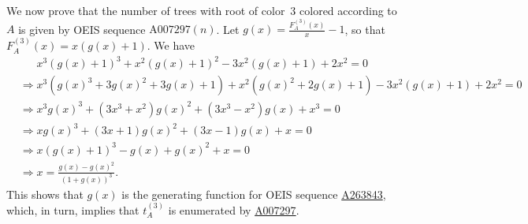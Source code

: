 \documentclass[12pt]{amsart}
\newcommand{\seqnum}[1]{\href{https://oeis.org/#1}{#1}}
\newcommand{\gff}[2]{F_{#2}^{(#1)}(x)}
\newcommand{\gfa}[1]{\gff{#1}{A}}
\begin{document}
\begin{description}
    We now prove that the number of trees with root of color~3 colored according to $A$ is given by OEIS sequence $\text{A007297}(n)$.
    Let $g(x)=\frac{\gfa{3}}{x}-1$, so that $\gfa{3}=x\left(g(x)+1\right)$. We have
    \begin{align*}
        &\phantom{\Rightarrow} x^3\left(g(x)+1\right)^3+x^2\left(g(x)+1\right)^2-3x^2\left(g(x)+1\right)+2x^2=0\\
        &\Rightarrow x^3\left(g(x)^3+3g(x)^2+3g(x)+1\right)+x^2\left(g(x)^2+2g(x)+1\right)-3x^2\left(g(x)+1\right)+2x^2=0\\
        &\Rightarrow x^3g(x)^3+\left(3x^3+x^2\right)g(x)^2+\left(3x^3-x^2\right)g(x)+x^3=0\\
        &\Rightarrow xg(x)^3+\left(3x+1\right)g(x)^2+\left(3x-1\right)g(x)+x=0\\
        &\Rightarrow x(g(x)+1)^3-g(x)+g(x)^2+x=0\\
        &\Rightarrow x=\frac{g(x)-g(x)^2}{(1+g(x))^3}.
    \end{align*}
    This shows that $g(x)$ is the generating function for OEIS sequence \seqnum{A263843}, which, in turn, implies that $t_A^{(3)}$ is enumerated by \seqnum{A007297}.
\end{description}
\end{document}
